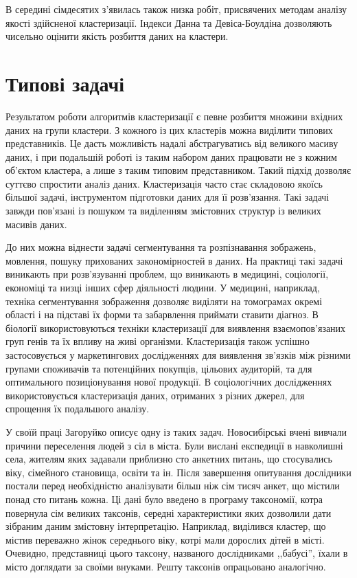     В середині сімдесятих з'явилась також низка робіт, присвячених методам аналізу якості здійсненої кластеризації. Індекси Данна \cite{Dunn} та  Девіса-Боулдіна \cite{DavisBouldin} дозволяють чисельно оцінити якість розбиття даних на кластери.

\section{Типові задачі}
    Результатом роботи алгоритмів кластеризації є певне розбиття множини вхідних даних на групи кластери. З кожного із цих кластерів можна виділити типових представників. Це дасть можливість надалі абстрагуватись від великого масиву даних, і при подальшій роботі із таким набором даних працювати не з кожним об’єктом кластера, а лише з таким типовим представником. Такий підхід дозволяє суттєво спростити аналіз даних. Кластеризація часто стає складовою якоїсь більшої задачі, інструментом підготовки даних для її розв'язання. Такі задачі завжди пов'язані із пошуком та виділенням змістовних структур із великих масивів даних. 

    До них можна віднести задачі сегментування та розпізнавання зображень, мовлення, пошуку прихованих закономірностей в даних. На практиці такі задачі виникають при розв'язуванні проблем, що виникають в медицині, соціології, економіці та низці інших сфер діяльності людини. 
    У медицині, наприклад, техніка сегментування зображення дозволяє виділяти на томограмах окремі області і на підставі їх форми та забарвлення приймати ставити діагноз. В біології використовуються техніки кластеризації для виявлення взаємопов'язаних груп генів та їх впливу на живі організми. Кластеризація також успішно застосовується у маркетингових дослідженнях для виявлення зв'язків між різними групами споживачів та потенційних покупців, цільових аудиторій, та для оптимального позиціонування нової продукції. 
    В соціологічних дослідженнях використовується кластеризація даних, отриманих з різних джерел, для спрощення їх подальшого аналізу. 

    У своїй праці \cite{Zagorujko} Загоруйко описує одну із таких задач. Новосибірські вчені вивчали причини переселення людей з сіл в міста. Були вислані експедиції в навколишні села, жителям яких задавали приблизно сто анкетних питань, що стосувались віку, сімейного становища, освіти та ін. Після завершення опитування дослідники постали перед необхідністю аналізувати більш ніж сім тисяч анкет, що містили понад сто питань кожна. 
    Ці дані було введено в програму таксономії, котра повернула сім великих таксонів, середні характеристики яких дозволили дати зібраним даним змістовну інтерпретацію. Наприклад, виділився кластер, що містив переважно жінок середнього віку, котрі мали дорослих дітей в місті. Очевидно, представниці цього таксону, названого дослідниками ,,бабусі'', їхали в місто доглядати за своїми внуками. Решту таксонів опрацьовано аналогічно.
    
